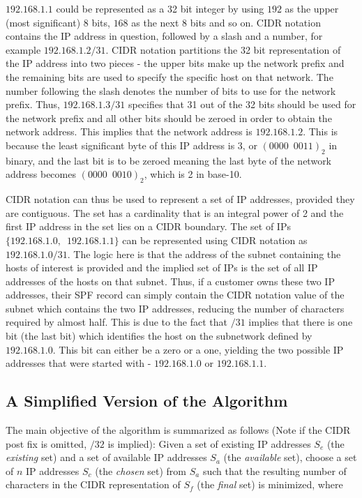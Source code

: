 $192.168.1.1$ could be represented as a 32 bit integer by using $192$ as the upper (most significant) 8 bits, $168$ as the next 8 bits and so on. CIDR notation contains the IP address in question, followed by a slash and a number, for example $192.168.1.2/31$. CIDR notation partitions the 32 bit representation of the IP address into two pieces - the upper bits make up the network prefix and the remaining bits are used to specify the specific host on that network. The number following the slash denotes the number of bits to use for the network prefix. Thus, $192.168.1.3/31$ specifies that 31 out of the 32 bits should be used for the network prefix and all other bits should be zeroed in order to obtain the network address. This implies that the network address is $192.168.1.2$. This is because the least significant byte of this IP address is 3, or $(0000\enspace0011)_2$ in binary, and the last bit is to be zeroed meaning the last byte of the network address becomes $(0000\enspace0010)_2$, which is 2 in base-10. 

CIDR notation can thus be used to represent a set of IP addresses, provided they are contiguous. The set has a cardinality that is an integral power of 2 and the first IP address in the set lies on a CIDR boundary. The set of IPs $\{192.168.1.0,\enspace192.168.1.1\}$ can be represented using CIDR notation as $192.168.1.0/31$. The logic here is that the address of the subnet containing the hosts of interest is provided and the implied set of IPs is the set of all IP addresses of the hosts on that subnet.  Thus, if a customer owns these two IP addresses, their SPF record can simply contain the CIDR notation value of the subnet which contains the two IP addresses, reducing the number of characters required by almost half. This is due to the fact that $/31$ implies that there is one bit (the last bit) which identifies the host on the subnetwork defined by $192.168.1.0$. This bit can either be a zero or a one, yielding the two possible IP addresses that were started with - $192.168.1.0$ or $192.168.1.1$.

\subsection{A Simplified Version of the Algorithm}
The main objective of the algorithm is summarized as follows (Note if the CIDR post fix is omitted, $/32$ is implied): \hfill\break\break
Given a set of existing IP addresses $S_e$ (the \textit{existing} set) and a set of available IP addresses $S_a$ (the \textit{available} set), choose a set of $n$ IP addresses $S_c$ (the \textit{chosen} set) from $S_a$ such that the resulting number of characters in the CIDR representation of $S_f$ (the \textit{final} set) is minimized, where 

